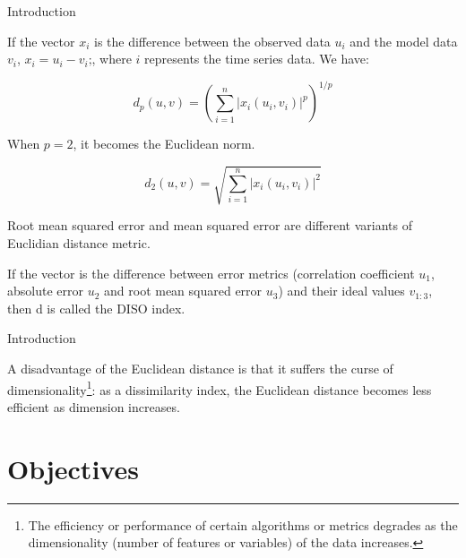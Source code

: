 \documentclass[xcolor={dvipsnames}]{beamer}
\begin{document}
\begin{frame}{Introduction}

If the vector $x_i$ is the difference between the observed data $u_i$ and the model data $v_i$, $ x_i = u_i - v_i \text{;}$, where $i$ represents the time series data. We have:

\[
d_p(u, v) = \left( \sum_{i=1}^{n} \left| x_i(u_i, v_i) \right|^p \right)^{1/p}
\]

\pause

When $p = 2$, it becomes the Euclidean norm. 

\[
d_2(u, v) = \sqrt{\sum_{i=1}^{n} \left| x_i(u_i, v_i) \right|^2}
\]

\pause

Root mean squared error and mean squared error are different variants of Euclidian distance metric.

If the vector is the difference between error metrics (correlation coefficient $u_1$, absolute error $u_2$ and root mean squared error $u_3$) and their ideal values $v_{1:3}$, then d is called the DISO index.

\end{frame}

\begin{frame}{Introduction}

A disadvantage of the Euclidean distance is that it suffers the curse of dimensionality\footnote{The efficiency or performance of certain algorithms or metrics degrades as the dimensionality (number of features or variables) of the data increases.}: as a dissimilarity index, the Euclidean distance becomes less efficient as dimension increases. 
    
\end{frame}

\section{Objectives}
\end{document}
